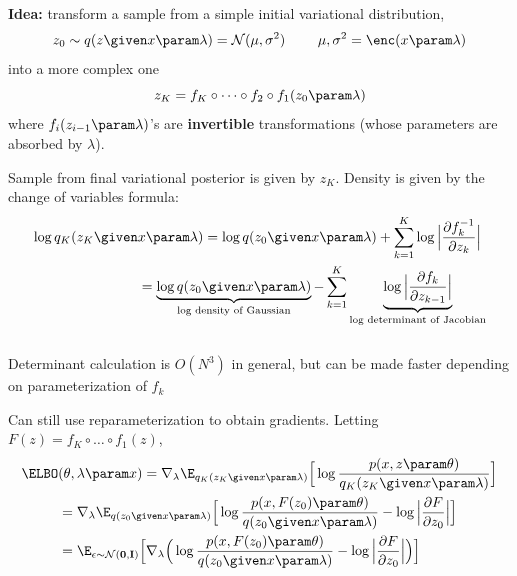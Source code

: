 \begin{frame}
\textbf{Idea:} transform a sample from a simple initial variational distribution, 
\[ z_0 \sim q(z \given x \param \lambda) = \mathcal{N}(\mu, \sigma^2) \,\,\,\,\,\,\,\,\,\,\,\,\,\, \mu, \sigma^2 = \enc(x \param \lambda)\]
\pause
into a more complex one
\[ z_K = f_K \circ \dots \circ f_2 \circ f_1(z_0 \param \lambda)\]
where $f_i(z_{i-1}\param \lambda)$'s are \textbf{invertible} transformations (whose parameters are
absorbed by $\lambda$).
\end{frame} 


\begin{frame}
Sample from final variational posterior is given by $z_K$. Density is given by the change of variables formula:
\begin{align*}
\log q_K(z_K \given &x \param \lambda) = \log q(z_0 \given x \param \lambda) + 
\sum_{k=1}^K \log \Big | \frac{\partial f_k^{-1}}{\partial z_{k}}\Big |  \\
&=\underbrace{\log q(z_0 \given x \param \lambda)}_{\text{log density of Gaussian}} - 
\sum_{k=1}^K \underbrace{\log \Big | \frac{\partial f_k}{\partial z_{k-1}}\Big |}_{\text{log determinant of Jacobian}} 
\end{align*}
\\
\vspace{5mm}
Determinant calculation is $O(N^3)$ in general, but can be made faster depending on parameterization of $f_k$ 
\end{frame} 

\begin{frame}
Can still use reparameterization  to obtain gradients.  Letting $F(z) = f_{K} \circ \dots \circ f_1 (z) $,
\begin{align*}
\ELBO&(\theta, \lambda \param x) = \nabla_\lambda \E_{q_K(z_K \given x \param \lambda)}\Big[\log \frac{p (x, z  \param \theta)}{q_K(z_K \given x \param \lambda)}\Big] \\
&= \nabla_\lambda \E_{q(z_0 \given x \param \lambda)}\Big[\log \frac{p (x, F(z_0) \param \theta)}{q(z_0 \given x \param \lambda)} - \log \Big| \frac{\partial F}{\partial z_0}\Big|\Big] \\
&=  \E_{\epsilon \sim \mathcal{N}(\mathbf{0}, \mathbf{I})}\Big[\nabla_\lambda \Big( \log \frac{p (x, F(z_0) \param \theta)}{q(z_0 \given x \param \lambda)} - \log \Big| \frac{\partial F}{\partial z_0}\Big|\Big) \Big] 
\end{align*}
\end{frame} 

